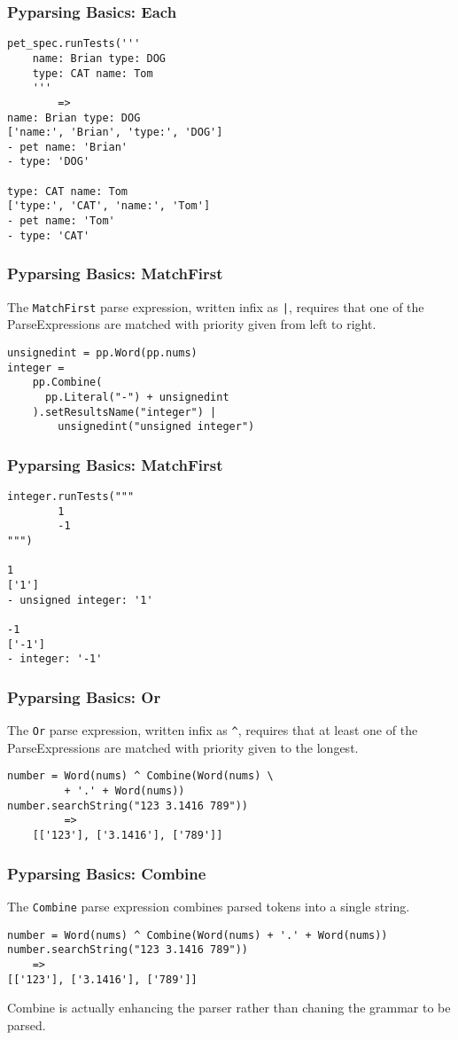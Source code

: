 \documentclass{beamer}
\begin{document}
\begin{frame}[fragile]
\frametitle{Pyparsing Basics: Each}
\begin{verbatim}
pet_spec.runTests('''
    name: Brian type: DOG
    type: CAT name: Tom
    '''
        =>	
name: Brian type: DOG
['name:', 'Brian', 'type:', 'DOG']
- pet name: 'Brian'
- type: 'DOG'

type: CAT name: Tom
['type:', 'CAT', 'name:', 'Tom']
- pet name: 'Tom'
- type: 'CAT'
\end{verbatim}
\end{frame}


\begin{frame}[fragile]
\frametitle{Pyparsing Basics: MatchFirst}
The \texttt{MatchFirst} parse expression, written infix as \texttt{|}, requires that one of the ParseExpressions are matched with priority given from left to right.
\begin{verbatim}
unsignedint = pp.Word(pp.nums)
integer = 
    pp.Combine(
      pp.Literal("-") + unsignedint
    ).setResultsName("integer") | 
        unsignedint("unsigned integer")
\end{verbatim} 
\end{frame}




\begin{frame}[fragile]
\frametitle{Pyparsing Basics: MatchFirst}
\begin{verbatim}
integer.runTests("""
        1
        -1
""")

1
['1']
- unsigned integer: '1'

-1
['-1']
- integer: '-1'
\end{verbatim} 
\end{frame}

\begin{frame}[fragile]
\frametitle{Pyparsing Basics: Or}
The \texttt{Or} parse expression, written infix as \texttt{\^}, requires that at least one of the ParseExpressions are matched with priority given to the longest.

\begin{verbatim}
number = Word(nums) ^ Combine(Word(nums) \
         + '.' + Word(nums))
number.searchString("123 3.1416 789"))
         =>
    [['123'], ['3.1416'], ['789']]
\end{verbatim}
\end{frame}

\begin{frame}[fragile]
\frametitle{Pyparsing Basics: Combine}
The \texttt{Combine} parse expression combines parsed tokens into a single string.

\begin{verbatim}
number = Word(nums) ^ Combine(Word(nums) + '.' + Word(nums))
number.searchString("123 3.1416 789"))
    =>
[['123'], ['3.1416'], ['789']]
\end{verbatim}
Combine is actually enhancing the parser rather than chaning the grammar to be parsed.
\end{frame}
\end{document}
